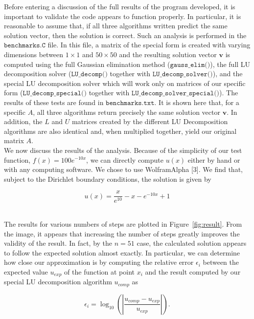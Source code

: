 \documentclass[12pt]{article}
\numberwithin{equation}{section}
\begin{document}
Before entering a discussion of the full results of the program developed, it is important to validate the code appears to function properly.  In particular, it is reasonable to assume that, if all three algorithms written predict the same solution vector, then the solution is correct.  Such an analysis is performed in the $\texttt{benchmarks.C}$ file.  In this file, a matrix of the special form is created with varying dimensions between $1\times1$ and $50\times50$ and the resulting solution vector $\textbf{v}$ is computed using the full Gaussian elimination method ($\texttt{gauss\_elim()}$), the full LU decomposition solver ($\texttt{LU\_decomp()}$ together with $\texttt{LU\_decomp\_solver()}$), and the special LU decomposition solver which will work only on matrices of our specific form ($\texttt{LU\_decomp\_special()}$ together with $\texttt{LU\_decomp\_solver\_special()}$).  The results of these tests are found in $\texttt{benchmarks.txt}$.  It is shown here that, for a specific $A$, all three algorithms return precisely the same solution vector $\textbf{v}$.  In addition, the $L$ and $U$ matrices created by the different LU Decomposition algorithms are also identical and, when multiplied together, yield our original matrix $A$.
\\\indent We now discuss the results of the analysis.  Because of the simplicity of our test function, $f\left(x\right)=100e^{-10x}$, we can directly compute $u\left(x\right)$ either by hand or with any computing software.  We chose to use WolframAlpha [3].  We find that, subject to the Dirichlet boundary conditions, the solution is given by 

\begin{equation}
\label{eq:expectsol}
u\left(x\right)=\frac{x}{e^{10}}-x-e^{-10x}+1
\end{equation}

\\\indent The results for various numbers of steps are plotted in Figure~\ref{fig:result}.  From the image, it appears that increasing the number of steps greatly improves the validity of the result.  In fact, by the $n=51$ case, the calculated solution appears to follow the expected solution almost exactly.  In particular, we can determine how close our approximation is by computing the relative error $\epsilon_{i}$ between the expected value $u_{exp}$ of the function at point $x_{i}$ and the result computed by our special LU decomposition algorithm $u_{comp}$ as 

\begin{equation}
\label{eq:relerror}
\epsilon_{i} = \log_{10}\left(\left|\frac{u_{comp}-u_{exp}}{u_{exp}}\right|\right).
\end{equation}
\end{document}
